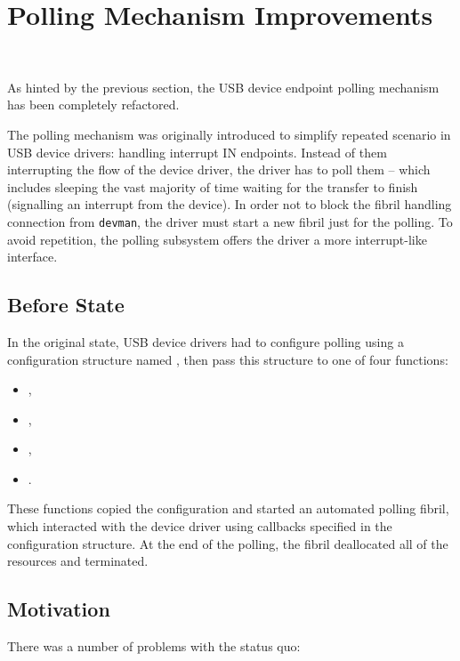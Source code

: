 \section{Polling Mechanism Improvements}~\label{polling-refactoring}

As hinted by the previous section, the USB device endpoint polling mechanism has
been completely refactored.

The polling mechanism was originally introduced to simplify repeated scenario
in USB device drivers: handling interrupt IN endpoints. Instead of them
interrupting the flow of the device driver, the driver has to poll them --
which includes sleeping the vast majority of time waiting for the transfer to
finish (signalling an interrupt from the device). In order not to block the
fibril handling connection from \texttt{devman}, the driver must start a new
fibril just for the polling. To avoid repetition, the polling subsystem offers
the driver a more interrupt-like interface.

\subsection{Before State}

In the original state, USB device drivers had to configure polling using a
configuration structure named , then pass this
structure to one of four functions:

\begin{itemize}
	\item {},
	\item {},
	\item {},
	\item {}.
\end{itemize}

These functions copied the configuration and started an automated polling
fibril, which interacted with the device driver using callbacks specified in the
configuration structure. At the end of the polling, the fibril deallocated all
of the resources and terminated.


\subsection{Motivation}

There was a number of problems with the status quo:

